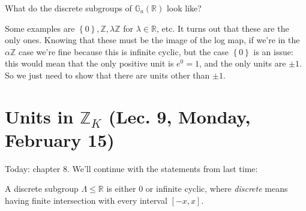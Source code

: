 \begin{question}

What do the discrete subgroups of \({\mathbb{G}}_a({\mathbb{R}})\) look
like?

\end{question}

\begin{answer}

Some examples are
\(\left\{{0}\right\}, {\mathbb{Z}}, \lambda {\mathbb{Z}}\) for
\(\lambda \in {\mathbb{R}}\), etc. It turns out that these are the only
ones. Knowing that these must be the image of the log map, if we're in
the \(\alpha{\mathbb{Z}}\) case we're fine because this is infinite
cyclic, but the case \(\left\{{ 0 }\right\}\) is an issue: this would
mean that the only positive unit is \(e^0 = 1\), and the only units are
\(\pm 1\). So we just need to show that there are units other than
\(\pm 1\).

\end{answer}

\hypertarget{units-in-mathbbz_k-lec.-9-monday-february-15}{%
\section{\texorpdfstring{Units in \({\mathbb{Z}}_K\) (Lec. 9, Monday,
February
15)}{Units in \{\textbackslash mathbb\{Z\}\}\_K (Lec. 9, Monday, February 15)}}\label{units-in-mathbbz_k-lec.-9-monday-february-15}}

\begin{remark}

Today: chapter 8. We'll continue with the statements from last time:

\end{remark}

\begin{proposition}

A discrete subgroup \(\Lambda \leq {\mathbb{R}}\) is either \(0\) or
infinite cyclic, where \emph{discrete} means having finite intersection
with every interval \([-x, x]\).

\end{proposition}

